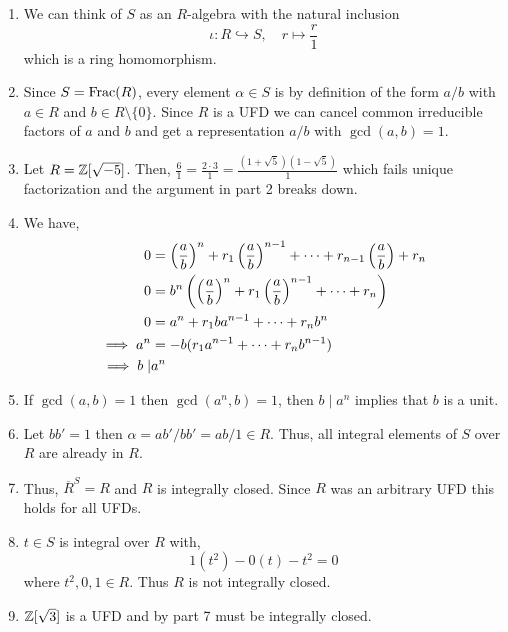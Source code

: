 \documentclass[Notebook.tex]{subfiles}
\begin{document}
\begin{solution}
    \bbni
    \begin{enumerate}
        \item We can think of $S$ as an $R$-algebra with the natural inclusion 
        \[\iota: R \hookrightarrow S, \quad r \mapsto \frac{r}{1}\]
        which is a ring homomorphism. 

        \item Since $S = \text{Frac}(R)$, every element $\alpha \in S$ is by definition of the form $a/b$ with $a \in R$ and $b \in R \setminus \{0\}$. Since $R$ is a UFD we can cancel common irreducible factors of $a$ and $b$ and get a representation $a/b$ with $\gcd(a, b) = 1$. 
        
        \item Let $R = \mathbb Z[\sqrt{-5}]$. Then, $\frac{6}{1} = \frac{2 \cdot 3}{1} = \frac{(1+\sqrt{5})(1-\sqrt{5})}{1}$ which fails unique factorization and the argument in part 2 breaks down.
        
        \item We have, 
        \begin{align*}
            0 &=  \left(\frac{a}{b}\right)^n +r_1\left(\frac{a}{b}\right)^{n-1} +\cdots +r_{n-1}\left(\frac{a}{b}\right) +r_n \\ 
            0 &= b^n \left(\left(\frac{a}{b}\right)^n + r_1\left(\frac{a}{b}\right)^{n-1} + \cdots + r_n\right) \\ 
            0 &= a^n + r_1 b a^{n-1} + \cdots + r_nb^n \\ 
        \implies a^n &= - b(r_1 a^{n-1} + \cdots + r_nb^{n-1})  \\ 
        \implies b \mid& a^n 
        \end{align*}

        \item If $\gcd(a,b) = 1$ then $\gcd(a^n, b) = 1$, then $b \mid a^n$ implies that $b$ is a unit. 
        
        \item Let $bb' = 1$ then $\alpha = ab'/bb' = ab/1 \in R$. Thus, all integral elements of $S$ over $R$ are already in $R$. 
        
        \item Thus, $\overline{R}^S = R$ and $R$ is integrally closed. Since $R$ was an arbitrary UFD this holds for all UFDs. 
        
        \item $t \in S$ is integral over $R$ with, 
        \[1(t^2) - 0(t) - t^2 = 0\]
        where $t^2, 0, 1 \in R$. Thus $R$ is not integrally closed. 

        \item $\mathbb Z[\sqrt{3}]$ is a UFD and by part 7 must be integrally closed. 
    \end{enumerate}
\end{solution}
\end{document}

